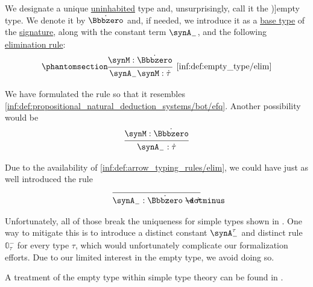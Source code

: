 \begin{definition}\label{def:empty_type}\mimprovised
  We designate a unique \hyperref[def:type_habitation]{uninhabited} type and, unsurprisingly, call it the \term[en=empty type (\cite[\S 4.3.4]{Mimram2020ProgramEqualsProof})]{empty type}. We denote it by \( \syn\Bbbzero \) and, if needed, we introduce it as a \hyperref[def:simple_type]{base type} of the \hyperref[def:simple_type_signature]{signature}, along with the constant term \( \synA_- \), and the following \hyperref[rem:type_theory_rule_classification/elimination]{elimination rule}:
  \begin{equation*}\taglabel[\ensuremath{ \Bbbzero^- }]{inf:def:empty_type/elim}
    \begin{prooftree}
      \hypo{ \synM: \syn\Bbbzero }
      \infer1[\ref{inf:def:empty_type/elim}]{ \synA_- \synM: \syn\tau }
    \end{prooftree}
  \end{equation*}
\end{definition}
\begin{comments}
  \item We have formulated the rule so that it resembles \ref{inf:def:propositional_natural_deduction_systems/bot/efq}. Another possibility would be
  \begin{equation*}
    \begin{prooftree}
      \hypo{ \synM: \syn\Bbbzero }
      \infer1{ \synA_-: \syn\tau }
    \end{prooftree}
  \end{equation*}

  Due to the availability of \ref{inf:def:arrow_typing_rules/elim}, we could have just as well introduced the rule
  \begin{equation*}
    \begin{prooftree}
      \infer0{ \synA_-: \syn\Bbbzero \synimplies \syn\tau }
    \end{prooftree}
  \end{equation*}

  Unfortunately, all of those break the uniqueness for simple types shown in . One way to mitigate this is to introduce a distinct constant \( \synA_-^\tau \) and distinct rule \( \Bbbzero^-_\tau \) for every type \( \tau \), which would unfortunately complicate our formalization efforts. Due to our limited interest in the empty type, we avoid doing so.

  \item A treatment of the empty type within simple type theory can be found in \cite[\S 4.3.4]{Mimram2020ProgramEqualsProof}.
\end{comments}

